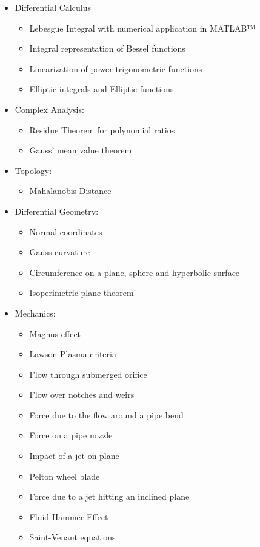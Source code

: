 \begin{itemize}
		\item Differential Calculus
			\begin{itemize}
				\item Lebesgue Integral with numerical application in MATLAB™
				\item Integral representation of Bessel functions
				\item Linearization of power trigonometric functions
				\item Elliptic integrals and Elliptic functions
			\end{itemize}
		\item Complex Analysis: 
			\begin{itemize}
				\item Residue Theorem for polynomial ratios
				\item Gauss' mean value theorem
			\end{itemize}
		\item Topology: 
			\begin{itemize}
				\item Mahalanobis Distance
			\end{itemize}			
		\item Differential Geometry: 
			\begin{itemize}
				\item Normal coordinates
				\item Gauss curvature
				\item Circumference on a plane, sphere and hyperbolic surface
				\item Isoperimetric plane theorem
			\end{itemize}
		\item Mechanics: 
			\begin{itemize}
				\item Magnus effect
				\item Lawson Plasma criteria
				\item Flow through submerged orifice
				\item Flow over notches and weirs
				\item Force due to the flow around a pipe bend
				\item Force on a pipe nozzle
				\item Impact of a jet on plane
				\item Pelton wheel blade
				\item Force due to a jet hitting an inclined plane
				\item Fluid Hammer Effect
				\item Saint-Venant equations

\end{itemize}
\end{itemize}
